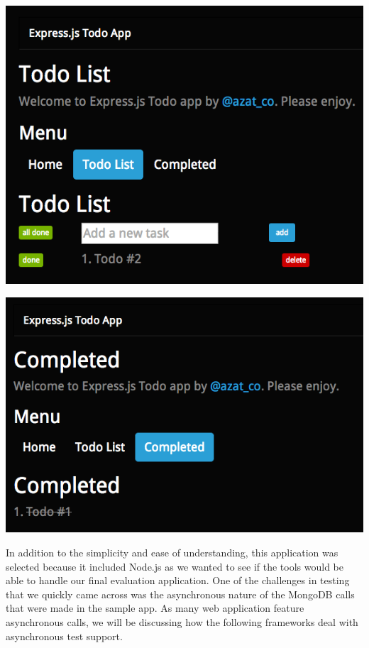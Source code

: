 \documentclass[12pt]{ucthesis}
\newenvironment{Figure}
  {\par\medskip\noindent\minipage{\linewidth}}
  {\endminipage\par\medskip}
\begin{document}
\begin{Figure}
  \centering
  \includegraphics[width=0.75\linewidth]{todo_some_tasks.png}
  
  
\end{Figure}

\begin{Figure}
  \centering
  \includegraphics[width=0.75\linewidth]{todo_completed.png}
  

\end{Figure}

In addition to the simplicity and ease of understanding, this application was selected because it included Node.js as we wanted to see if the tools would be able to handle our final evaluation application.
One of the challenges in testing that we quickly came across was the asynchronous nature of the MongoDB calls that were made in the sample app. As many web application feature asynchronous calls, we will be discussing how the following frameworks deal with asynchronous test support.
\end{document}
